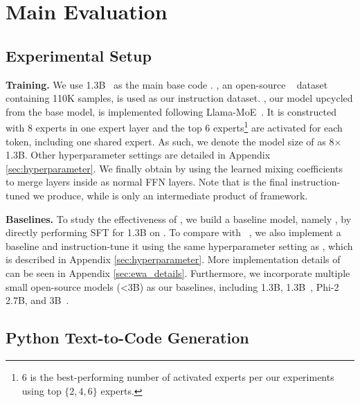 \section{Main Evaluation}\label{sec:experiment}


\subsection{Experimental Setup}
\textbf{Training.} 
We use \dscoderbase 1.3B~\cite{guo2024deepseekcoder} as the main base code \llm. 
\evolcode, an open-source \evolinstruct~\cite{luo2023wizardcoder} dataset containing 110K samples, is used as our instruction dataset.
\textbf{\oursmoe}, our \moe model upcycled from the base model, is implemented following Llama-MoE~\cite{llama-moe-2023}. 
It is constructed with 8 experts in one expert layer and the top 6 experts\footnote{
6 is the best-performing number of activated experts per our \humanevalp{} experiments using top $\{2,4,6\}$ experts.} are activated for each token, including one shared expert. 
As such, we denote the model size of \textbf{\oursmoe} as 8$\times$1.3B.
Other hyperparameter settings are detailed in Appendix \ref{sec:hyperparameter}. 
We finally obtain \textbf{\oursmerge} by using the learned mixing coefficients to merge \moe layers inside \oursmoe as normal FFN layers. 
Note that \textbf{\oursmerge} is the final instruction-tuned \llm we produce, while \textbf{\oursmoe} is only an intermediate product of \ours framework.


\textbf{Baselines.} 
To study the effectiveness of \ours, we build a baseline model, namely \textbf{\baselineds}, by directly performing SFT for \dscoderbase 1.3B on \evolcode. 
To compare \ours with \ewa~\cite{huang2023experts}, we also implement a baseline \textbf{\ewads} and instruction-tune it using the same hyperparameter setting as \baselineds, which is described in Appendix \ref{sec:hyperparameter}. More implementation details of \ewads can be seen in Appendix \ref{sec:ewa_details}. 
Furthermore, we incorporate multiple small open-source models (<3B) as our baselines, including \dscoderbase 1.3B, \dscoderinst 1.3B~\cite{guo2024deepseekcoder}, Phi-2 2.7B, and \stablecoder 3B~\cite{stable-code-3b}.




\subsection{Python Text-to-Code Generation}

